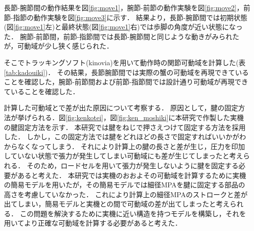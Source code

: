 \documentclass{jarticle}
\begin{document}
長節-腕節間の動作結果を図\ref{fig:move1}，腕節-前節の動作実験を図\ref{fig:move2}，前節-指節の動作実験を図\ref{fig:move3}に示す．
結果より，長節-腕節間では初期状態(図\ref{fig:move1}左)と最終状態(図\ref{fig:move1}右)では歩脚の角度が近い状態になった．
腕節-前節間，前節-指節間では長節-腕節間と同じような動きがみられたが，可動域が少し狭く感じられた．

そこでトラッキングソフト(kinovia)を用いて動作時の関節可動域を計算した(表\ref{tab:kadouiki})．
その結果，長節腕節間では実際の蟹の可動域を再現できていることを確認した，腕節-前節間および前節-指節間では設計通り可動域が再現できていることを確認した．

計算した可動域とで差が出た原因について考察する．
原因として，腱の固定方法が挙げられる．図\ref{fig:kenkotei}，図\ref{fig:ken_moshiki}に本研究で作製した実機の腱固定方法を示す．
本研究では腱をねじで押さえつけて固定する方法を採用した．
しかし，この固定方法では腱をどれほどの長さで固定すればいいかがわからなくなってしまう．
それにより計算上の腱の長さと差が生じ，圧力を印加していない状態で張力が発生してしまい可動域にも差が生じてしまったと考えられる．
そのため，ロードセルを用いて張力が発生しないように腱を固定する必要があると考えた．
本研究では実機のおおよその可動域を計算するために実機の簡易モデルを用いたが，その簡易モデルでは細径MPAを腱に固定する部品の高さを考慮していなかった．
これにより計算上の細径MPAのストロークと差が出てしまい，簡易モデルと実機との間で可動域の差が出てしまったと考えられる．
この問題を解決するために実機に近い構造を持つモデルを構築し，それを用いてより正確な可動域を計算する必要があると考えた．

\end{document}
